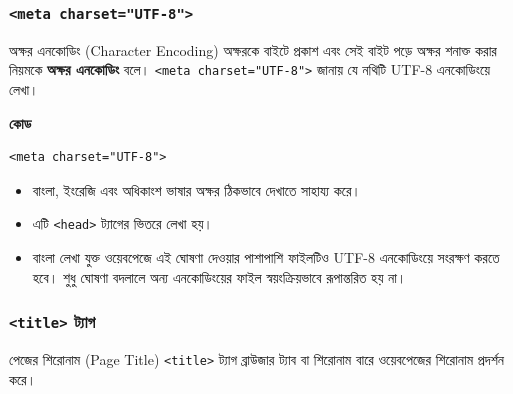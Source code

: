 \subsubsection{\texttt{<meta charset="UTF-8">}}

\begin{definitionbox}{অক্ষর এনকোডিং (Character Encoding)}
অক্ষরকে বাইটে প্রকাশ এবং সেই বাইট পড়ে অক্ষর শনাক্ত করার নিয়মকে \textbf{অক্ষর এনকোডিং} বলে। \texttt{<meta charset="UTF-8">} জানায় যে নথিটি UTF-8 এনকোডিংয়ে লেখা।
\end{definitionbox}

\par\noindent
\begin{minipage}[t]{.50\linewidth}\vspace{0pt}\small
\textbf{\color{chFourTeal}কোড}\par
\begin{verbatim}
<meta charset="UTF-8">
\end{verbatim}

\par\smallskip
\end{minipage}\hfill
\begin{minipage}[t]{.46\linewidth}\vspace{0pt}\small
\begin{itemize}
\item বাংলা, ইংরেজি এবং অধিকাংশ ভাষার অক্ষর ঠিকভাবে দেখাতে সাহায্য করে।
\item এটি \texttt{<head>} ট্যাগের ভিতরে লেখা হয়।
\item বাংলা লেখা যুক্ত ওয়েবপেজে এই ঘোষণা দেওয়ার পাশাপাশি ফাইলটিও UTF-8 এনকোডিংয়ে সংরক্ষণ করতে হবে। শুধু ঘোষণা বদলালে অন্য এনকোডিংয়ের ফাইল স্বয়ংক্রিয়ভাবে রূপান্তরিত হয় না।
\end{itemize}
\end{minipage}\par




\subsubsection{\texttt{<title>} ট্যাগ}

\begin{definitionbox}{পেজের শিরোনাম (Page Title)}
\texttt{<title>} ট্যাগ ব্রাউজার ট্যাব বা শিরোনাম বারে ওয়েবপেজের শিরোনাম প্রদর্শন করে।
\end{definitionbox}

